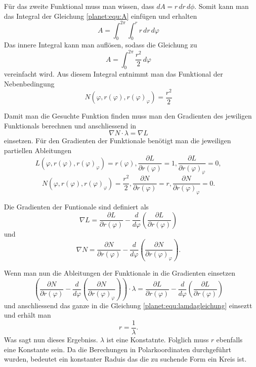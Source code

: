 Für das zweite Funktional muss man wissen, dass \(dA = r \, dr \, d\phi\).
Somit kann man das Integral der Gleichung \ref{planet:equ:A} einfügen und erhalten
\begin{equation*}
	A = \int_{0}^{2\pi}\int_{0}^{r} r \, dr \, d\varphi
\end{equation*}
Das innere Integral kann man auflösen, sodass die Gleichung zu
\begin{equation*}
	A = \int_{0}^{2\pi}\frac{r^2}{2} \, d\varphi
\end{equation*}
vereinfacht wird.
Aus diesem Integral entnimmt man das Funktional der Nebenbedingung
\begin{equation*}
	N(\varphi ,r(\varphi),r(\varphi)_\varphi) = \frac{r^2}{2} 
\end{equation*}

Damit man die Gesuchte Funktion finden muss man den Gradienten des jewiligen Funktionals berechnen und anschliessend in
\begin{equation}
	\nabla N \cdot \lambda = \nabla L
	\label{planet:equ:lamdagleichung}
\end{equation}
einsetzen.
Für den Gradienten der Funktionale benötigt man die jeweiligen partiellen Ableitungen
\begin{equation*}
	L(\varphi ,r(\varphi),r(\varphi)_\varphi) = r(\varphi),
	\frac{\partial L}{\partial r(\varphi)} = 1,
	\frac{\partial L}{\partial r(\varphi)_\varphi} = 0,
\end{equation*}
\begin{equation*}
	N(\varphi ,r(\varphi),r(\varphi)_\varphi) = \frac{r^2}{2} ,
	\frac{\partial N}{\partial r(\varphi)} = r,
	\frac{\partial N}{\partial r(\varphi)_\varphi} = 0.
\end{equation*}

Die Gradienten der Funtionale sind definiert als 
\begin{equation*}
	\nabla L = 
	\frac{\partial L}{\partial r(\varphi)}-  \frac{d}{d\varphi}\left( \frac{\partial L}{\partial r(\varphi)} \right)
\end{equation*}
und
\begin{equation*}
	\nabla N = \frac{\partial N}{\partial r(\varphi)} - \frac{d}{d\varphi}\left(\frac{\partial N}{\partial r(\varphi)_\varphi}\right).
\end{equation*}

Wenn man nun die Ableitungen der Funktionale in die Gradienten einsetzen
\begin{equation*}
	\left(\frac{\partial N}{\partial r(\varphi)} - \frac{d}{d\varphi}\left(\frac{\partial N}{\partial r(\varphi)_\varphi}\right)\right)\cdot \lambda = \frac{\partial L}{\partial r(\varphi)}-  \frac{d}{d\varphi}\left( \frac{\partial L}{\partial r(\varphi)} \right)
\end{equation*} 
und anschliessend das ganze in die Gleichung \ref{planet:equ:lamdagleichung}
einseztt und erhält man
\begin{equation*}
	r = \frac{1}{\lambda}.
\end{equation*}
Was sagt nun dieses Ergebniss.
\(\lambda\) ist eine Konstatnte.
Folglich muss \(r\) ebenfalls eine Konstante sein.
Da die Berechungen in Polarkoordinaten durchgeführt wurden, bedeutet ein konstanter Raduis das die zu suchende Form ein Kreis ist.

